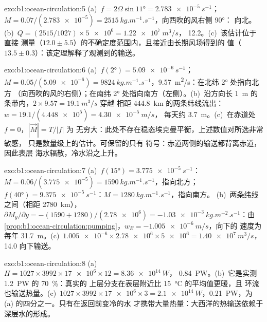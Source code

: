 \begin{solution}{exo:b1:ocean-circulation:5}
(a)~$f = 2\Omega\sin\ang{11} = \qty{2.783e-5}{s^{-1}}$；$M = 0.07/(\num{2.783e-5}) =
\qty{2515}{kg.m^{-1}.s^{-1}}$，向西吹的风右侧 \ang{90}：
向北。(b)~$Q = (2515/1027) \times \num{5e6} = \qty{1.22e7}{m^3/s}$，
\qty{12.2}{\sverdrup}。(c)~该估计位于直接
测量（$12.0 \pm 5.5$）的不确定度范围内，且接近由长期风场得到的
值（$13.5 \pm 0.3$）：该定理解释了观测到的输送。
\end{solution}

\begin{solution}{exo:b1:ocean-circulation:6}
(a)~$f(\ang{2}) = \qty{5.09e-6}{s^{-1}}$；$M = 0.05/(\num{5.09e-6}) =
\qty{9824}{kg.m^{-1}.s^{-1}}$，\qty{9.57}{m^2/s}：在北纬 \ang{2} 处指向北方
（向西吹的风的右侧）；在南纬 \ang{2} 处指向南方（左侧）。(b)~沿方向长
\qty{1}{m} 的条带内，$2 \times 9.57 = \qty{19.1}{m^3/s}$ 穿越
相距 \qty{444.8}{km} 的两条纬线流出：$w = 19.1/(\num{4.448e5}) = \qty{4.30e-5}{m/s}$，
每天约 \qty{3.7}{m}。(c)~在赤道处 $f = 0$，$|\vec M| = T/|f|$ 为
无穷大：此处不存在稳态埃克曼平衡，上述数值对所选非常敏感，
只是数量级上的估计。可保留的只有
符号：赤道两侧的输送都背离赤道，因此表层
海水辐散，冷水沿之上升。
\end{solution}

\begin{solution}{exo:b1:ocean-circulation:7}
(a)~$f(\ang{15}) = \qty{3.775e-5}{s^{-1}}$：$M = 0.06/(\num{3.775e-5}) =
\qty{1590}{kg.m^{-1}.s^{-1}}$，指向北方；$f(\ang{40}) =
\qty{9.375e-5}{s^{-1}}$：$M = \qty{1280}{kg.m^{-1}.s^{-1}}$，指向南方。
(b)~两条纬线之间（相距 \qty{2780}{km}），$\partial M_y/\partial y =
-(1590 + 1280)/(\num{2.78e6}) = \qty{-1.03e-3}{kg.m^{-2}.s^{-1}}$：由
\cref{prop:b1:ocean-circulation:pumping}，$w_E = \qty{-1.005e-6}{m/s}$，向下的
速度为每年 \qty{31.7}{m}。(c)~$\num{1.005e-6} \times \num{2.78e6} \times
\num{5e6} = \qty{1.40e7}{m^3/s}$，\qty{14.0}{\sverdrup} 向下输送。
\end{solution}

\begin{solution}{exo:b1:ocean-circulation:8}
(a)~$H = 1027 \times 3992 \times \num{17e6} \times 12 = \qty{8.36e14}{W}$，
\qty{0.84}{PW}。(b)~它是实测 \qty{1.2}{PW} 的 \qty{70}{\percent}：真实的
上层分支在表层附近比 \qty{15}{\celsius} 的平均值更暖，且
环流也输送热量。(c)~$1027 \times 3992 \times \num{17e6} \times 3 =
\qty{2.1e14}{W}$，\qty{0.21}{PW}，为 (a) 的四分之一。只有在返回前变冷的水
才携带大量热量：大西洋的热输送依赖于
深层水的形成。
\end{solution}

